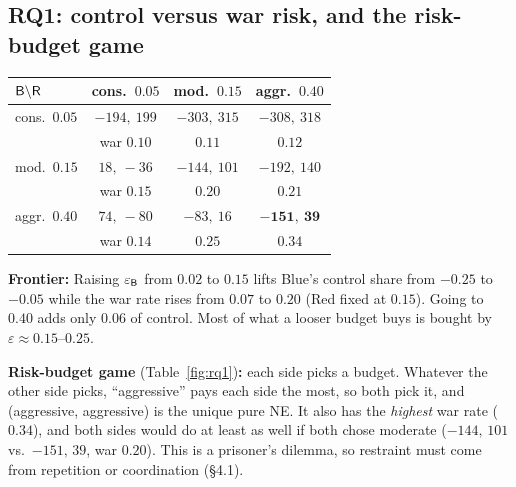 \subsection{RQ1: control versus war risk, and the risk-budget game}
\noindent\begin{minipage}[t]{0.40\textwidth}\vspace{0pt}\centering\footnotesize\setlength{\tabcolsep}{2pt}
\begin{tabular}{l|ccc}
\toprule
$\mathsf{B}\backslash\mathsf{R}$ & cons.\ $0.05$ & mod.\ $0.15$ & aggr.\ $0.40$\\\midrule
cons.\ $0.05$ & $-194,\ 199$ & $-303,\ 315$ & $-308,\ 318$\\
              & war $0.10$ & $0.11$ & $0.12$\\
mod.\ $0.15$  & $18,\ -36$ & $-144,\ 101$ & $-192,\ 140$\\
              & war $0.15$ & $0.20$ & $0.21$\\
aggr.\ $0.40$ & $74,\ -80$ & $-83,\ 16$ & $\mathbf{-151,\ 39}$\\
              & war $0.14$ & $0.25$ & $\mathbf{0.34}$\\
\bottomrule
\end{tabular}
\label{fig:rq1}
\end{minipage}\hfill
\begin{minipage}[t]{0.58\textwidth}\vspace{0pt}
\textbf{Frontier:} Raising $\varepsilon_{\mathsf{B}}$ from $0.02$ to $0.15$ lifts Blue's control share from $-0.25$ to
$-0.05$ while the war rate rises from $0.07$ to $0.20$ (Red fixed at $0.15$). Going to $0.40$ adds only $0.06$ of control. Most of what a looser budget buys is bought by $\varepsilon\approx0.15$--$0.25$.

\smallskip\textbf{Risk-budget game} (Table~\ref{fig:rq1})\textbf{:} each side picks a budget. Whatever the other
side picks, ``aggressive'' pays each side the most, so both pick it, and
(aggressive, aggressive) is the unique pure NE. It also has the \emph{highest} war rate ($0.34$), and both sides
would do at least as well if both chose moderate ($-144,\,101$ vs.\ $-151,\,39$, war $0.20$). This is a prisoner's
dilemma, so restraint must come from repetition or coordination (\S4.1).
\end{minipage}

